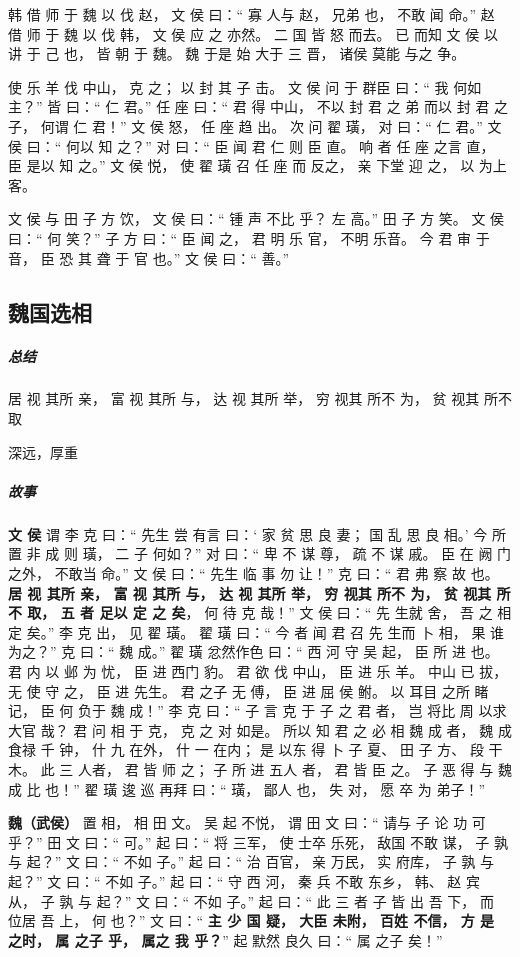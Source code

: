 \documentclass[UTF8,a4paper,8pt]{ctexbook}
\begin{document}
				韩 借 师 于 魏 以 伐 赵， 文 侯 曰：“ 寡 人与 赵， 兄弟 也， 不敢 闻 命。” 赵 借 师 于 魏 以 伐 韩， 文 侯 应 之 亦然。 二 国 皆 怒 而去。 已 而知 文 侯 以 讲 于 己 也， 皆 朝 于 魏。 魏 于是 始 大于 三 晋， 诸侯 莫能 与之 争。
				
				使 乐 羊 伐 中山， 克 之； 以 封 其 子 击。 文 侯 问 于 群臣 曰：“ 我 何如 主？” 皆 曰：“ 仁 君。” 任 座 曰：“ 君 得 中山， 不以 封 君 之 弟 而以 封 君 之子， 何谓 仁 君！” 文 侯 怒， 任 座 趋 出。 次 问 翟 璜， 对 曰：“ 仁 君。” 文 侯 曰：“ 何以 知 之？” 对 曰：“ 臣 闻 君 仁 则 臣 直。 响 者 任 座 之言 直， 臣 是以 知 之。” 文 侯 悦， 使 翟 璜 召 任 座 而 反之， 亲 下堂 迎 之， 以 为上 客。
				
				文 侯 与 田 子 方 饮， 文 侯 曰：“ 锺 声 不比 乎？ 左 高。” 田 子 方 笑。 文 侯 曰：“ 何 笑？” 子 方 曰：“ 臣 闻 之， 君 明 乐 官， 不明 乐音。 今 君 审 于 音， 臣 恐 其 聋 于 官 也。” 文 侯 曰：“ 善。”

		
		\subsection{魏国选相}
			\subparagraph{总结}居 视 其所 亲， 富 视 其所 与， 达 视 其所 举， 穷 视其 所不 为， 贫 视其 所不 取
				
				深远，厚重
			
			
			\subparagraph{故事}
				\textbf{文 侯} 谓 李 克 曰：“ 先生 尝 有言 曰：‘ 家 贫 思 良 妻； 国 乱 思 良 相。’ 今 所 置 非 成 则 璜， 二 子 何如？” 对 曰：“ 卑 不 谋 尊， 疏 不 谋 戚。 臣 在 阙 门 之外， 不敢当 命。” 文 侯 曰：“ 先生 临 事 勿 让！” 克 曰：“ 君 弗 察 故 也。 \textbf{居 视 其所 亲， 富 视 其所 与， 达 视 其所 举， 穷 视其 所不 为， 贫 视其 所不 取， 五 者 足以 定 之 矣}， 何 待 克 哉！” 文 侯 曰：“ 先 生就 舍， 吾 之 相 定 矣。” 李 克 出， 见 翟 璜。 翟 璜 曰：“ 今 者 闻 君 召 先 生而 卜 相， 果 谁 为之？” 克 曰：“ 魏 成。” 翟 璜 忿然作色 曰：“ 西 河 守 吴 起， 臣 所 进 也。 君 内 以 邺 为 忧， 臣 进 西门 豹。 君 欲 伐 中山， 臣 进 乐 羊。 中山 已 拔， 无 使 守 之， 臣 进 先生。 君 之子 无 傅， 臣 进 屈 侯 鲋。 以 耳目 之所 睹 记， 臣 何 负于 魏 成！” 李 克 曰：“ 子 言 克 于 子 之 君 者， 岂 将比 周 以求 大官 哉？ 君 问 相 于 克， 克 之 对 如是。 所以 知 君 之 必 相 魏 成 者， 魏 成 食禄 千 钟， 什 九 在外， 什 一 在内； 是 以东 得 卜 子 夏、 田 子 方、 段 干 木。 此 三 人者， 君 皆 师 之； 子 所 进 五人 者， 君 皆 臣 之。 子 恶 得 与 魏 成 比 也！” 翟 璜 逡 巡 再拜 曰：“ 璜， 鄙人 也， 失 对， 愿 卒 为 弟子！”


				\textbf{魏（武侯）} 置 相， 相 田 文。 吴 起 不悦， 谓 田 文 曰：“ 请与 子 论 功 可 乎？” 田 文 曰：“ 可。” 起 曰：“ 将 三军， 使 士卒 乐死， 敌国 不敢 谋， 子 孰 与 起？” 文 曰：“ 不如 子。” 起 曰：“ 治 百官， 亲 万民， 实 府库， 子 孰 与 起？” 文 曰：“ 不如 子。” 起 曰：“ 守 西 河， 秦 兵 不敢 东乡， 韩、 赵 宾 从， 子 孰 与 起？” 文 曰：“ 不如 子。” 起 曰：“ 此 三 者 子 皆 出 吾 下， 而 位居 吾 上， 何 也？” 文 曰：“ \textbf{主 少 国 疑， 大臣 未附， 百姓 不信， 方 是 之时， 属 之子 乎， 属之 我 乎？}” 起 默然 良久 曰：“ 属 之子 矣！” 
		
\end{document}
